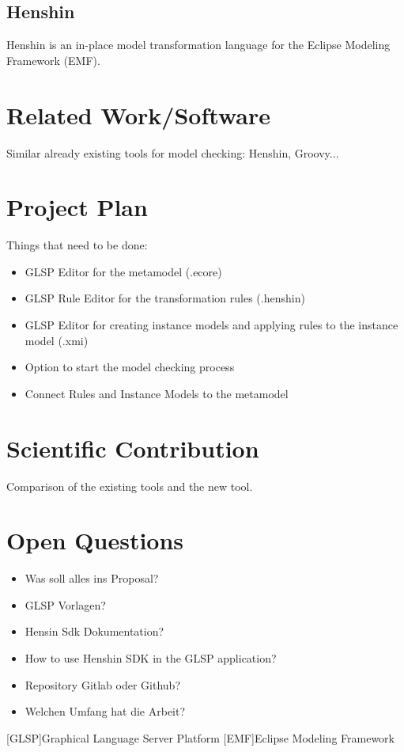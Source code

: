 \documentclass[conference,onecolumn]{IEEEtran}
\begin{document}
  \subsection{Henshin}
  \label{subsec:henshin}
  Henshin is an in-place model transformation language for the Eclipse Modeling Framework (EMF).
  \cite{henshin-repo}

  \section{Related Work/Software}
  \label{sec:related-work}

  Similar already existing tools for model checking: Henshin, Groovy...

  \section{Project Plan}
  \label{sec:project-plan}

  Things that need to be done:

  \begin{itemize}
    \item GLSP Editor for the metamodel (.ecore)
    \item GLSP Rule Editor for the transformation rules (.henshin)
    \item GLSP Editor for creating instance models and applying rules to the instance model (.xmi)
    \item Option to start the model checking process
    \item Connect Rules and Instance Models to the metamodel
  \end{itemize}

  \section{Scientific Contribution}
  \label{sec:scientific-contribution}

  Comparison of the existing tools and the new tool.

  \section{Open Questions}

  \begin{itemize}
    \item Was soll alles ins Proposal?
    \item GLSP Vorlagen?
    \item Hensin Sdk Dokumentation?
    \item How to use Henshin SDK in the GLSP application?
    \item Repository Gitlab oder Github?
    \item Welchen Umfang hat die Arbeit?

  \end{itemize}



  \printbibliography

  \begin{acronym}
    [GLSP]{Graphical Language Server Platform}
    [EMF]{Eclipse Modeling Framework}

  \end{acronym}
\end{document}
